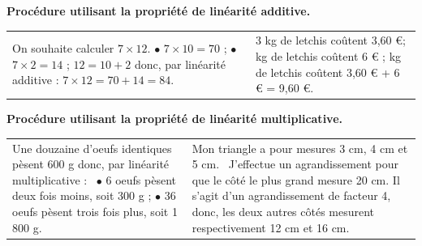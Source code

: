 {\bf Procédure utilisant la propriété de linéarité additive.}
\begin{center}
{\renewcommand{\arraystretch}{1.2}
\begin{tabular}{|p{7cm}|p{7cm}|}
   \hline
   \cellcolor{FondTableaux}{Nombres et calculs} & \cellcolor{FondTableaux}{Grandeurs et mesures} \\
   \hline
   On souhaite calculer $7\times12$. \newline
   $\bullet$ $7\times10 =70$ ; \newline
   $\bullet$ $7\times2 =14$ ; \newline
   $12 =10+2$ donc, par linéarité additive : \newline
   $7\times12 =70+14 =84$.
   &
   3 kg de letchis coûtent 3,60 \euro ; \newline
   5 kg de letchis coûtent 6 \euro{} ; \newline
   8 kg de letchis coûtent 3,60 \euro{} + 6 \euro{} = 9,60 \euro. \\
   \hline 
\end{tabular}}
\end{center}

\smallskip

{\bf Procédure utilisant la propriété de linéarité multiplicative.}
\begin{center}
{\renewcommand{\arraystretch}{1.2}
\begin{tabular}{|p{7cm}|p{7cm}|}
   \hline
   \cellcolor{FondTableaux}{Grandeurs et mesures} & \cellcolor{FondTableaux}{Espace et géométrie} \\
   \hline
   Une douzaine d'oeufs identiques pèsent 600 g \newline
   donc, par linéarité multiplicative : \newline\
   $\bullet$ 6 oeufs pèsent deux fois moins, soit 300 g ; \newline
   $\bullet$ 36 oeufs pèsent trois fois plus, soit 1 800 g. 
   &
   Mon triangle a pour mesures 3 cm, 4 cm et 5 cm. \newline\
   J'effectue un agrandissement pour que le côté le plus grand mesure 20 cm. \newline
   Il s'agit d'un agrandissement de facteur 4, donc, les deux autres côtés mesurent respectivement 12 cm et 16 cm. \\
   \hline 
\end{tabular}}
\end{center}

\smallskip

